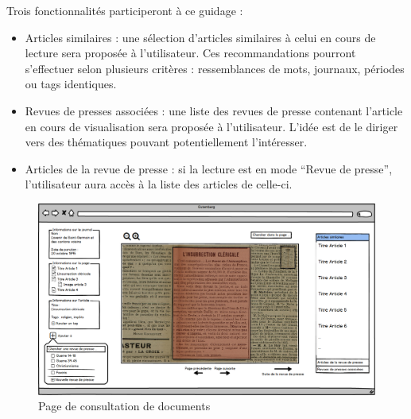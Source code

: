 	Trois fonctionnalités participeront à ce guidage :
\begin{itemize}
\item Articles similaires : une sélection d’articles similaires à celui en cours de lecture sera proposée à l’utilisateur. Ces recommandations pourront s’effectuer selon plusieurs critères : ressemblances de mots, journaux, périodes ou tags identiques.
\item Revues de presses associées : une liste des revues de presse contenant l’article en cours de visualisation sera proposée à l’utilisateur. L’idée est de le diriger vers des thématiques pouvant potentiellement l’intéresser.
\item Articles de la revue de presse : si la lecture est en mode “Revue de presse”, l’utilisateur aura accès à la liste des articles de celle-ci.
\end{itemize}

\bigskip

    \begin{figure}[H]
        \centering
        \includegraphics[width=\textwidth]{figures/consultation.png}
            \caption{Page de consultation de documents}
            \label{fig:consultation}
    \end{figure}